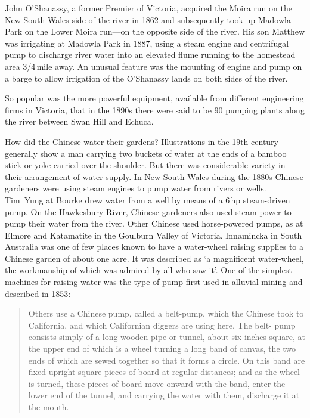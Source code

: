 John O'Shanassy, a former Premier of Victoria, acquired the Moira run
on the New South Wales side of the river in 1862 and subsequently took
up Madowla Park on the Lower Moira run---on the opposite side of the
river.  His son Matthew was irrigating at Madowla Park in 1887, using
a steam engine and centrifugal pump to discharge river water into an
elevated flume running to the homestead area 3/4\,mile away. An
unusual feature was the mounting of engine and pump on a barge to
allow irrigation of the O'Shanassy lands on both sides of the
river.

So popular was the more powerful equipment, available from different
engineering firms in Victoria, that in the 1890s there were said to be
90 pumping plants along the river between Swan Hill and
Echuca.

How did the Chinese water their gardens?  Illustrations in the 19th
century generally show a man carrying two buckets of water at the ends
of a bamboo stick or yoke carried over the shoulder.  But there was
considerable variety in their arrangement of water supply.  In New
South Wales during the 1880s Chinese gardeners were using steam
engines to pump water from rivers or wells.  Tim~Yung at Bourke drew
water from a well by means of a 6\,hp steam-driven pump.  On the
Hawkesbury River, Chinese gardeners also used steam power to pump
their water from the river.  Other Chinese used horse-powered pumps,
as at Elmore and Katamatite in the Goulburn Valley of Victoria.
Innamincka in South Australia was one of few places known to have a
water-wheel raising supplies to a Chinese garden of about one acre.
It was described as `a magnificent water-wheel, the workmanship of
which was admired by all who saw it'.  One of the simplest machines for
raising water was the type of pump first used in alluvial mining and
described in 1853:
\begin{quote}	
	Others use a Chinese pump, called a belt-pump, which the
	Chinese took to California, and which Californian diggers are
	using here.  The belt- pump consists simply of a long wooden
	pipe or tunnel, about six inches square, at the upper end of
	which is a wheel turning a long band of canvas, the two ends
	of which are sewed together so that it forms a circle.  On
	this band are fixed upright square pieces of board at regular
	distances; and as the wheel is turned, these pieces of board
	move onward with the band, enter the lower end of the tunnel,
	and carrying the water with them, discharge it at the
	mouth.
\end{quote}

